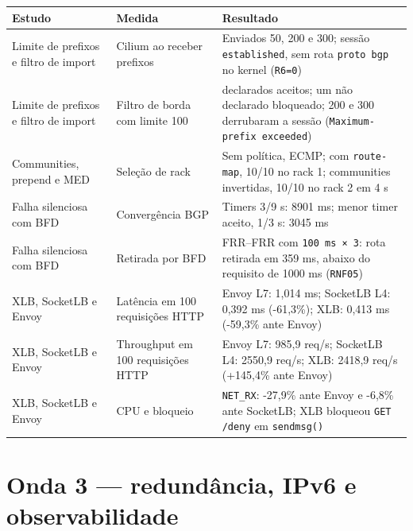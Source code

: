 \documentclass[12pt,openany,oneside,a4paper,chapter=TITLE,english,brazil]{abntex2}
\begin{document}
\begin{quadro}[!htbp]
\caption{Resultados de prefixos, BFD e XLB}
\footnotesize
\begin{tabularx}{\textwidth}{|>{\raggedright\arraybackslash\hsize=0.855\hsize}X|>{\raggedright\arraybackslash\hsize=0.819\hsize}X|>{\raggedright\arraybackslash\hsize=1.326\hsize}X|}
\hline
\textbf{Estudo} & \textbf{Medida} & \textbf{Resultado} \\
\hline
Limite de prefixos e filtro de import & Cilium ao receber prefixos & Enviados 50, 200 e 300; sessão \texttt{established}, sem rota
\texttt{proto bgp} no kernel (\texttt{R6=\allowbreak{}0}) \\
\hline
Limite de prefixos e filtro de import & Filtro de borda com limite 100 & 50 declarados aceitos; um não declarado bloqueado; 200 e 300 derrubaram
a sessão (\texttt{Maximum-{}\allowbreak{}prefix exceeded}) \\
\hline
Communities, prepend e MED & Seleção de rack & Sem política, ECMP; com \texttt{route-{}\allowbreak{}map}, 10/10 no rack
1; communities invertidas, 10/10 no rack 2 em 4 s \\
\hline
Falha silenciosa com BFD & Convergência BGP & Timers 3/9 s: 8901 ms; menor timer aceito, 1/3 s: 3045 ms \\
\hline
Falha silenciosa com BFD & Retirada por BFD & FRR--FRR com \texttt{100 ms × 3}: rota retirada em 359 ms, abaixo do
requisito de 1000 ms (\texttt{RNF05}) \\
\hline
XLB, SocketLB e Envoy & Latência em 100 requisições HTTP & Envoy L7: 1,014 ms; SocketLB L4: 0,392 ms (-61,3\%); XLB: 0,413 ms
(-59,3\% ante Envoy) \\
\hline
XLB, SocketLB e Envoy & Throughput em 100 requisições HTTP & Envoy L7: 985,9 req/s; SocketLB L4: 2550,9 req/s; XLB: 2418,9 req/s
(+145,4\% ante Envoy) \\
\hline
XLB, SocketLB e Envoy & CPU e bloqueio & \texttt{NET\_\allowbreak{}RX}: -27,9\% ante Envoy e -6,8\% ante
SocketLB; XLB bloqueou \texttt{GET /\allowbreak{}deny} em
\texttt{sendmsg(\allowbreak{})} \\
\hline
\end{tabularx}
\end{quadro}

\section{Onda 3 --- redundância, IPv6 e observabilidade}\label{onda-3-redunduxe2ncia-ipv6-e-observabilidade}
\end{document}
